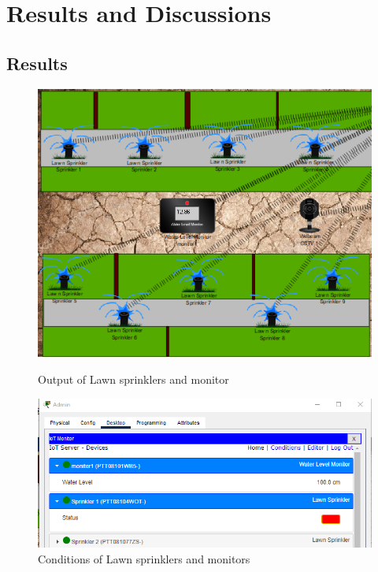 \documentclass{report}
\begin{document}
\section{Results and Discussions}
\subsection{Results}

\begin{figure}[h]

    \centering
   \begin{minipage}{0.40\textwidth}
    \centering
    \includegraphics[width=1\textwidth]{rs/2.png}
    \caption{Output of Lawn sprinklers and monitor}
    \label{fig:my_label}
    \end{minipage}
    \hfill
    \begin{minipage}{0.40\textwidth}
    \centering
    \includegraphics[width=1\textwidth]{rs/3.png}
    \caption{Conditions of Lawn sprinklers and monitors}
    \label{fig:my_label}
    \end{minipage}
\end{figure}
\end{document}
